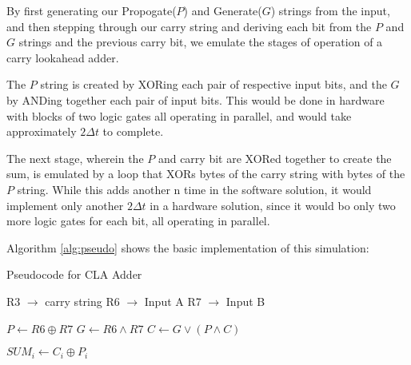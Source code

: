 \documentclass[journal]{IEEEtran}
\begin{document}
By first generating our Propogate($P$) and Generate($G$) strings from the input,
and then stepping through our carry string and deriving each bit from the
$P$ and $G$ strings and the previous carry bit, we emulate the stages of
operation of a carry lookahead adder.

The $P$ string is created by XORing each pair of respective input bits, and the
$G$ by ANDing together each pair of input bits. This would be done in hardware
with blocks of two logic gates all operating in parallel, and would take
approximately $2\Delta t$ to complete.

The next stage, wherein the $P$ and carry bit are XORed together to create the
sum, is emulated by a loop that XORs bytes of the carry string with bytes of
the $P$ string. While this adds another n time in the software solution, it
would implement only another $2\Delta t$ in a hardware solution, since it would
bo only two more logic gates for each bit, all operating in parallel.

Algorithm \ref{alg:pseudo}
shows the basic implementation of this simulation:
\begin{algorithm}[H]
\caption{Pseudocode for CLA Adder}
\label{alg:pseudo}
\begin{algorithmic}
\State R3 $\rightarrow$ carry string
\State R6 $\rightarrow$ Input A
\State R7 $\rightarrow$ Input B

	\State $P \gets R6 \oplus R7$
	\State $G \gets R6 \land R7$
\EndFor
{}
	\State $C \gets G \lor (P \land C)$
\EndFor

	\State $SUM_i \gets C_i \oplus P_i$
\EndFor
\end{algorithmic}
\end{algorithm}
\end{document}
